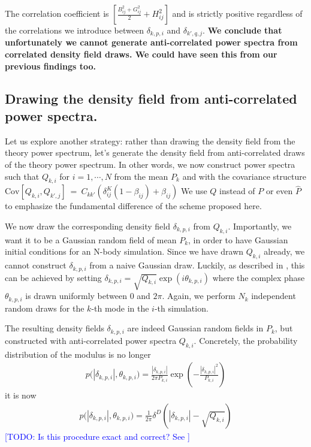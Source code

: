 \documentclass{aastex6}
\newcommand{\eqn}[1]{\begin{eqnarray}#1\end{eqnarray}}
\newcommand{\todo}[1]{\textcolor{blue}{[TODO: #1]}}
\begin{document}
 

The correlation coefficient is $\left[  \frac{B^2_{ij} + G^2_{ij}}{2}  + H^2_{ij}\right]$ and is strictly positive regardless of the correlations we introduce between $\delta_{k, p, i}$ and $\delta_{k', q, j}$.
\textbf{We conclude that unfortunately we cannot generate anti-correlated power spectra from correlated density field draws. We could have seen this from our previous findings too.}


\subsection{Drawing the density field from anti-correlated power spectra.}


Let us explore another strategy: rather than drawing the density field from the theory power spectrum, let's generate the density field from anti-correlated draws of the theory power spectrum. 
In other words, we now construct power spectra such that $Q_{k, i}$ for $i=1, \cdots, N$ from the mean $P_{k}$ and with the covariance structure $\mathrm{Cov}[{Q}_{k, i}, {Q}_{k', j}] \ = \ C_{kk'} \left( \delta^K_{ij}(1-\beta_{ij}) + \beta_{ij} \right)$
We use $Q$ instead of $P$ or even $\hat{P}$ to emphasize the fundamental difference of the scheme proposed here.

We now draw the corresponding density field $\delta_{k, p, i}$ from $Q_{k, i}$. Importantly, we want it to be a Gaussian random field of mean $P_{k}$, in order to have Gaussian initial conditions for an N-body simulation. 
Since we have drawn $Q_{k, i}$ already, we cannot construct $\delta_{k, p, i}$ from a naive Gaussian draw.
Luckily, as described in \cite{AnguloPontzen2016}, this can be achieved by setting 
$\delta_{k, p, i} = \sqrt{Q_{k, i}} \exp(i\theta_{k, p, i})$
where the complex phase $\theta_{k, p, i}$ is drawn uniformly between $0$ and $2\pi$.
Again, we perform $N_k$ independent random draws for the $k$-th mode in the $i$-th simulation.

The resulting density fields $\delta_{k, p, i} $ are indeed Gaussian random fields in $P_k$, but constructed with anti-correlated power spectra $Q_{k, i}$.
Concretely, the probability distribution of the modulus is no longer
\eqn{
	p\bigl(|\delta_{k, p, i}|, \theta_{k, p, i}\bigr) = \frac{|\delta_{k, p, i}|}{2\pi P_{k, i}} \exp\left( -\frac{|\delta_{k, p, i}|^2}{P_{k, i}}\right)
}
it is now
\eqn{
	p\bigl(|\delta_{k, p, i}|, \theta_{k, p, i}\bigr) = \frac{1}{2\pi} \delta^D\left(|\delta_{k, p, i}| - \sqrt{Q_{k, i}}\right)
}
\todo{Is this procedure exact and correct? See \cite{AnguloPontzen2016}}
\end{document}
